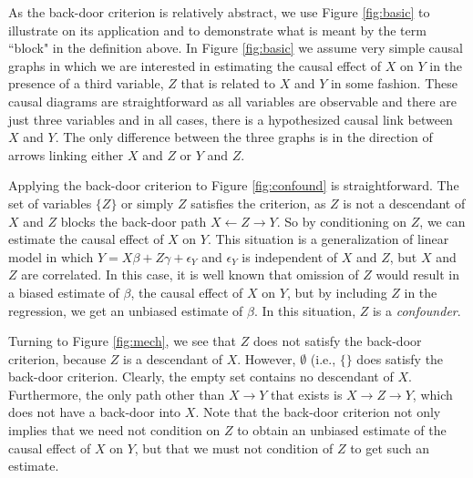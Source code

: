 \documentclass[11pt]{amsart}
\begin{document}



As the back-door criterion is relatively abstract, we use Figure \ref{fig:basic} to illustrate on its application and to demonstrate what is meant by the term ``block" in the definition above.
In Figure \ref{fig:basic} we assume very simple causal graphs in which we are interested in estimating the causal effect of $X$ on $Y$ in the presence of a third variable, $Z$ that is related to $X$ and $Y$ in some fashion.
These causal diagrams are straightforward as all variables are observable and there are just three variables and in all cases, there is a hypothesized causal link between $X$ and $Y$.
The only difference between the three graphs is in the direction of arrows linking either $X$ and $Z$ or $Y$ and $Z$.

Applying the back-door criterion to Figure \ref{fig:confound} is straightforward. The set of variables $\{Z\}$ or simply $Z$ satisfies the criterion, as $Z$ is not a descendant of $X$ and $Z$ blocks the back-door path $X \leftarrow Z \rightarrow Y$.
So by conditioning on $Z$, we can estimate the causal effect of $X$ on $Y$.
This situation is a generalization of linear model in which $Y = X \beta + Z \gamma + \epsilon_Y$ and $\epsilon_Y$ is independent of $X$ and $Z$, but $X$ and $Z$ are correlated.
In this case, it is well known that omission of $Z$ would result in a biased estimate of $\beta$, the causal effect of $X$ on $Y$, but by including $Z$ in the regression, we get an unbiased estimate of $\beta$.
In this situation, $Z$ is a \emph{confounder}.



Turning to Figure \ref{fig:mech}, we see that $Z$ does not satisfy the back-door criterion, because $Z$ is a descendant of $X$.
However, $\emptyset$ (i.e., $\{\}$ does satisfy the back-door criterion.
Clearly, the empty set contains no descendant of $X$.
Furthermore, the only path other than $X \rightarrow Y$ that exists is $X \rightarrow Z \rightarrow Y$, which does not have a back-door into $X$.
Note that the back-door criterion not only implies that we need not condition on $Z$ to obtain an unbiased estimate of the causal effect of $X$ on $Y$, but that we must not condition of $Z$ to get such an estimate.

\end{document}
